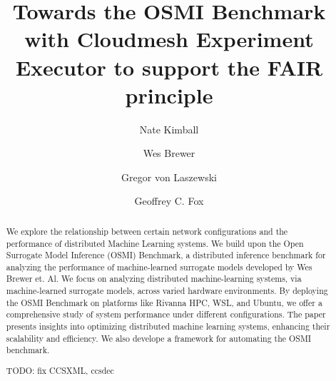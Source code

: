 \documentclass[sigplan,screen,noacm]{acmart}
\begin{document}
\title{Towards the OSMI Benchmark with Cloudmesh Experiment Executor to support the FAIR principle}


\author{Nate Kimball}

\author{Wes Brewer}

\author{Gregor von Laszewski}

\author{Geoffrey C. Fox}



\begin{abstract}
We explore the relationship between certain network configurations and the performance of distributed Machine Learning systems. We build upon the Open Surrogate Model Inference (OSMI) Benchmark, a distributed inference benchmark for analyzing the performance of machine-learned surrogate models developed by Wes Brewer et. Al. We focus on analyzing distributed machine-learning systems, via machine-learned surrogate models, across varied hardware environments. By deploying the OSMI Benchmark on platforms like Rivanna HPC, WSL, and Ubuntu, we offer a comprehensive study of system performance under different configurations. The paper presents insights into optimizing distributed machine learning systems, enhancing their scalability and efficiency. We also develope a framework for automating the OSMI benchmark. 

  TODO: fix CCSXML, ccsdec
\end{abstract}
\end{document}

